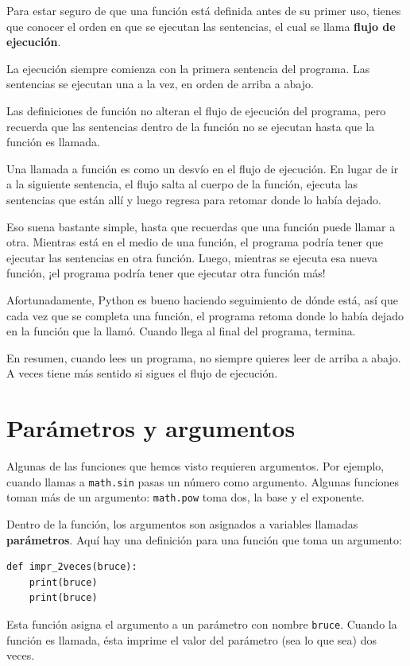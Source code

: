 \documentclass[10pt]{book}
\begin{document}
Para estar seguro de que una función está definida antes de su primer uso,
tienes que conocer el orden en que se ejecutan las sentencias, el cual se
llama {\bf flujo de ejecución}.

La ejecución siempre comienza con la primera sentencia del programa.
Las sentencias se ejecutan una a la vez, en orden de arriba a abajo.

Las definiciones de función no alteran el flujo de ejecución del
programa, pero recuerda que las sentencias dentro de la función no
se ejecutan hasta que la función es llamada.

Una llamada a función es como un desvío en el flujo de ejecución. En lugar de ir
a la siguiente sentencia, el flujo salta al cuerpo de
la función, ejecuta las sentencias que están allí y luego regresa
para retomar donde lo había dejado.

Eso suena bastante simple, hasta que recuerdas que una función puede
llamar a otra.  Mientras está en el medio de una función, el programa podría
tener que ejecutar las sentencias en otra función.  Luego, mientras
se ejecuta esa nueva función, ¡el programa podría tener que ejecutar
otra función más!

Afortunadamente, Python es bueno haciendo seguimiento de dónde está, así que cada
vez que se completa una función, el programa retoma donde lo había dejado en
la función que la llamó.  Cuando llega al final del programa,
termina.

En resumen, cuando lees un programa,
no siempre quieres leer de arriba a abajo.  A veces tiene
más sentido si sigues el flujo de ejecución.


\section{Parámetros y argumentos}
\label{parameters}

Algunas de las funciones que hemos visto requieren argumentos. Por
ejemplo, cuando llamas a {\tt math.sin} pasas un número
como argumento.  Algunas funciones toman más de un argumento:
{\tt math.pow} toma dos, la base y el exponente.

Dentro de la función, los argumentos son asignados a
variables llamadas {\bf parámetros}.  Aquí hay una definición para
una función que toma un argumento:

\begin{verbatim}
def impr_2veces(bruce):
    print(bruce)
    print(bruce)
\end{verbatim}
%
Esta función asigna el argumento a un parámetro
con nombre {\tt bruce}.  Cuando la función es llamada, ésta imprime el valor del
parámetro (sea lo que sea) dos veces.
\end{document}
